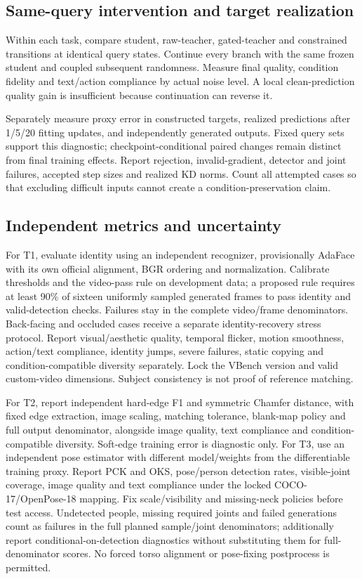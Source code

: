 \documentclass[11pt]{article}
\begin{document}
\subsection{Same-query intervention and target realization}
Within each task, compare student, raw-teacher, gated-teacher and constrained transitions at identical query states. Continue every branch with the same frozen student and coupled subsequent randomness. Measure final quality, condition fidelity and text/action compliance by actual noise level. A local clean-prediction quality gain is insufficient because continuation can reverse it.

Separately measure proxy error in constructed targets, realized predictions after 1/5/20 fitting updates, and independently generated outputs. Fixed query sets support this diagnostic; checkpoint-conditional paired changes remain distinct from final training effects. Report rejection, invalid-gradient, detector and joint failures, accepted step sizes and realized KD norms. Count all attempted cases so that excluding difficult inputs cannot create a condition-preservation claim.

\subsection{Independent metrics and uncertainty}
For T1, evaluate identity using an independent recognizer, provisionally AdaFace with its own official alignment, BGR ordering and normalization. Calibrate thresholds and the video-pass rule on development data; a proposed rule requires at least 90\% of sixteen uniformly sampled generated frames to pass identity and valid-detection checks. Failures stay in the complete video/frame denominators. Back-facing and occluded cases receive a separate identity-recovery stress protocol. Report visual/aesthetic quality, temporal flicker, motion smoothness, action/text compliance, identity jumps, severe failures, static copying and condition-compatible diversity separately. Lock the VBench version and valid custom-video dimensions. Subject consistency is not proof of reference matching.

For T2, report independent hard-edge F1 and symmetric Chamfer distance, with fixed edge extraction, image scaling, matching tolerance, blank-map policy and full output denominator, alongside image quality, text compliance and condition-compatible diversity. Soft-edge training error is diagnostic only. For T3, use an independent pose estimator with different model/weights from the differentiable training proxy. Report PCK and OKS, pose/person detection rates, visible-joint coverage, image quality and text compliance under the locked COCO-17/OpenPose-18 mapping. Fix scale/visibility and missing-neck policies before test access. Undetected people, missing required joints and failed generations count as failures in the full planned sample/joint denominators; additionally report conditional-on-detection diagnostics without substituting them for full-denominator scores. No forced torso alignment or pose-fixing postprocess is permitted.
\end{document}
